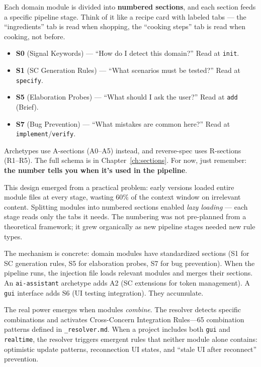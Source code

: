 \documentclass[11pt,a4paper,openright,twoside]{report}
\newcommand{\file}[1]{\texttt{#1}}
\begin{document}
\begin{tipbox}
Each domain module is divided into \textbf{numbered sections}, and each section feeds a specific pipeline stage. Think of it like a recipe card with labeled tabs --- the ``ingredients'' tab is read when shopping, the ``cooking steps'' tab is read when cooking, not before.

\begin{itemize}
  \item \textbf{S0} (Signal Keywords) --- ``How do I detect this domain?'' Read at \texttt{init}.
  \item \textbf{S1} (SC Generation Rules) --- ``What scenarios must be tested?'' Read at \texttt{specify}.
  \item \textbf{S5} (Elaboration Probes) --- ``What should I ask the user?'' Read at \texttt{add} (Brief).
  \item \textbf{S7} (Bug Prevention) --- ``What mistakes are common here?'' Read at \texttt{implement}/\texttt{verify}.
\end{itemize}

Archetypes use A-sections (A0--A5) instead, and reverse-spec uses R-sections (R1--R5). The full schema is in Chapter~\ref{ch:sections}. For now, just remember: \textbf{the number tells you when it's used in the pipeline}.

This design emerged from a practical problem: early versions loaded entire module files at every stage, wasting 60\% of the context window on irrelevant content. Splitting modules into numbered sections enabled \emph{lazy loading} --- each stage reads only the tabs it needs. The numbering was not pre-planned from a theoretical framework; it grew organically as new pipeline stages needed new rule types.
\end{tipbox}

The mechanism is concrete: domain modules have standardized sections (S1 for SC generation rules, S5 for elaboration probes, S7 for bug prevention). When the pipeline runs, the injection file loads relevant modules and merges their sections. An \texttt{ai-assistant} archetype adds A2 (SC extensions for token management). A \texttt{gui} interface adds S6 (UI testing integration). They accumulate.

The real power emerges when modules \emph{combine}. The resolver detects specific combinations and activates Cross-Concern Integration Rules---65 combination patterns defined in \file{\_resolver.md}. When a project includes both \texttt{gui} and \texttt{realtime}, the resolver triggers emergent rules that neither module alone contains: optimistic update patterns, reconnection UI states, and ``stale UI after reconnect'' prevention.
\end{document}
